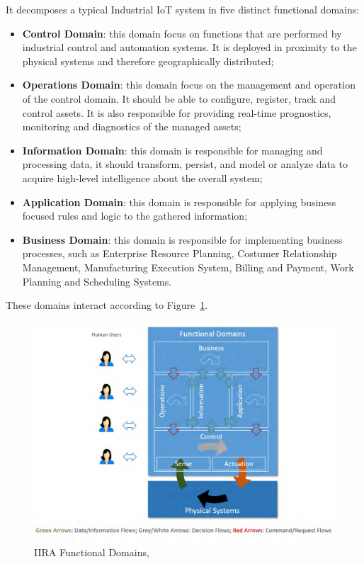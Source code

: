 It decomposes a typical Industrial \gls{IoT} system in five distinct functional domains:

\begin{itemize}
    \item \textbf{Control Domain}: this domain focus on functions that are performed by industrial control and automation systems. It is deployed in proximity to the physical systems and therefore geographically distributed;
    \item \textbf{Operations Domain}: this domain focus on the management and operation of the control domain. It should be able to configure, register, track and control assets. It is also responsible for providing real-time prognostics, monitoring and diagnostics of the managed assets;
    \item \textbf{Information Domain}: this domain is responsible for managing and processing data, it should transform, persist, and model or analyze data to acquire high-level intelligence about the overall system;
    \item \textbf{Application Domain}: this domain is responsible for applying business focused rules and logic to the gathered information;
    \item \textbf{Business Domain}: this domain is responsible for implementing business processes, such as Enterprise Resource Planning, Costumer Relationship Management, Manufacturing Execution System, Billing and Payment, Work Planning and Scheduling Systems. 
\end{itemize}

These domains interact according to Figure~\ref{fig:stateofart:arch:iira:domains}.

\begin{figure}[H]
    \centering
    \includegraphics[scale=0.5]{
        assets/figures/irra-domains.png
    }
    \caption[\gls{IIRA} Functional Domains]{\gls{IIRA} Functional Domains, \cite{iira}}
    \label{fig:stateofart:arch:iira:domains}
\end{figure}

